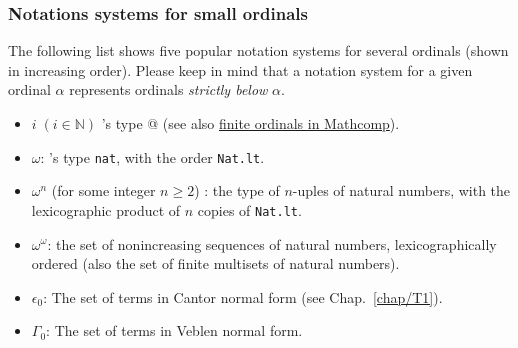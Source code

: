 \subsubsection{Notations systems for small ordinals}

The following list shows five popular notation systems for several ordinals (shown in increasing order).
Please keep in mind that a notation system for a given ordinal $\alpha$ represents 
ordinals \emph{strictly below} $\alpha$.

\begin{itemize}
\item $i\;(i\in\mathbb{N})$ \coq's type @ (see also
\href{https://www.math.nagoya-u.ac.jp/~garrigue/lecture/2018_AW/mathcomp-1.7.0/htmldoc/mathcomp.ssreflect.fintype.html#Ordinal}{finite ordinals in Mathcomp}).
\item $\omega$: \coq's type \texttt{nat}, with the order \texttt{Nat.lt}.
\item $\omega^n$ (for some  integer  $n\geq 2$) : the type of $n$-uples of natural numbers, with the lexicographic product of $n$ copies of \texttt{Nat.lt}.
\item  $\omega^\omega$: the set of nonincreasing sequences of natural numbers, lexicographically ordered (also the set of finite multisets of natural numbers).
\item $\epsilon_0$: The set of terms in Cantor normal form (see Chap.~\ref{chap/T1}).
\item $\Gamma_0$: The set of terms in Veblen normal form.
\end{itemize}


